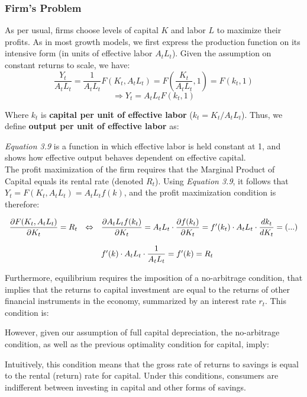 \subsubsection{Firm's Problem}

As per usual, firms choose levels of capital $K$ and labor $L$ to maximize their profits. As in most growth models, we first express the production function on its intensive form (in units of effective labor $A_tL_t$). Given the assumption on constant returns to scale, we have:
$$\dfrac{Y_t}{A_tL_t}=\dfrac{1}{A_tL_t}F(K_t,A_tL_t)=F\left(\dfrac{K_t}{A_tL_t},1\right)=F(k_t,1)$$
$$\Rightarrow Y_t=A_tL_t F(k_t,1)$$

\bigskip
Where $k_t$ is \textbf{capital per unit of effective labor} ($k_t=K_t/A_tL_t$). Thus, we define \textbf{output per unit of effective labor} as:

\bigskip
\textit{Equation 3.9} is a function in which effective labor is held constant at 1, and shows how effective output behaves dependent on effective capital. \\

The profit maximization of the firm requires that the Marginal Product of Capital equals its rental rate (denoted $R_t$). Using \textit{Equation 3.9}, it follows that $Y_t=F(K_t,A_tL_t)=A_tL_tf(k)$, and the profit maximization condition is therefore:

$$
\begin{array}{llllllll}
\dfrac{\partial F(K_t,A_tL_t)}{\partial K_t}=R_t & \Leftrightarrow & \dfrac{\partial A_tL_tf(k_t)}{\partial K_t}=A_tL_t\cdot \dfrac{\partial f(k_t)}{\partial K_t}=f'(k_t)\cdot A_tL_t\cdot \dfrac{d k_t}{dK_t} = (...)\\
\\
& &  f'(k)\cdot A_tL_t\cdot \dfrac{1}{A_tL_t}=f'(k) = R_t
\end{array}
$$

\bigskip
Furthermore, equilibrium requires the imposition of a no-arbitrage condition, that implies that the returns to capital investment are equal to the returns of other financial instruments in the economy, summarized by an interest rate $r_t$. This condition is:

\bigskip
However, given our assumption of full capital depreciation, the no-arbitrage condition, as well as the previous optimality condition for capital, imply:

\bigskip
Intuitively, this condition means that the gross rate of returns to savings is equal to the rental (return) rate for capital. Under this conditions, consumers are indifferent between investing in capital and other forms of savings.\\

